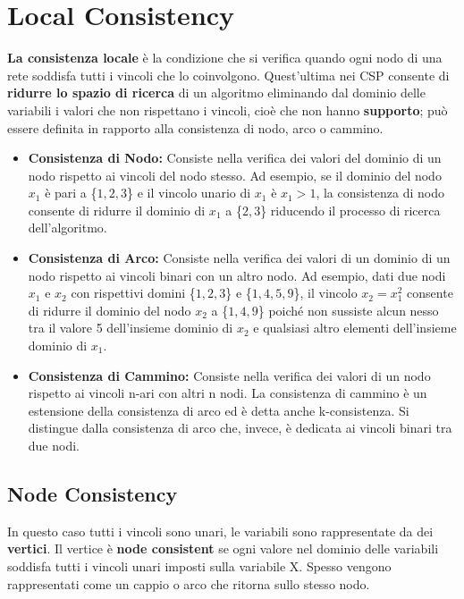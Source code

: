 \section{Local Consistency}
\textbf{La consistenza locale} è la condizione che si verifica quando ogni nodo
di una rete soddisfa tutti i vincoli che lo coinvolgono. Quest'ultima nei CSP
consente di \textbf{ridurre lo spazio di ricerca} di un algoritmo eliminando dal
dominio delle variabili i valori che non rispettano i vincoli, cioè che non
hanno \textbf{supporto}; può essere definita in rapporto alla consistenza di
nodo, arco o cammino.
\begin{itemize}
    \item \textbf{Consistenza di Nodo:} Consiste nella verifica dei valori del
          dominio di un nodo rispetto ai vincoli del nodo stesso. Ad esempio, se il
          dominio del nodo $x_1$ è pari a \{$1,2,3$\} e il vincolo unario di $x_1$ è $x_1 >
              1$, la consistenza di nodo consente di ridurre il dominio di $x_1$ a \{$2,3$\}
          riducendo il processo di ricerca dell'algoritmo.
    \item \textbf{Consistenza di Arco:} Consiste nella verifica dei valori di un
          dominio di un nodo rispetto ai vincoli binari con un altro nodo. Ad esempio,
          dati due nodi $x_1$ e $x_2$ con rispettivi domini \{$1,2,3$\} e \{$1,4,5,9$\}, il
          vincolo $x_2 = x_{1}^2$ consente di ridurre il dominio del nodo $x_2$ a \{$1,4,9$\}
          poiché non sussiste alcun nesso tra il valore 5 dell'insieme dominio di
          $x_2$ e qualsiasi altro elementi dell'insieme dominio di $x_1$.
    \item \textbf{Consistenza di Cammino:} Consiste nella verifica dei valori di
          un nodo rispetto ai vincoli n-ari con altri n nodi. La consistenza di
          cammino è un estensione della consistenza di arco ed è detta anche
          k-consistenza. Si distingue dalla consistenza di arco che, invece, è
          dedicata ai vincoli binari tra due nodi.
\end{itemize}

\subsection{Node Consistency}
In questo caso tutti i vincoli sono unari, le variabili sono rappresentate da
dei \textbf{vertici}. Il vertice è \textbf{node consistent} se ogni valore nel
dominio delle variabili soddisfa tutti i vincoli unari imposti sulla variabile
X. Spesso vengono rappresentati come un cappio o arco che ritorna sullo stesso
nodo.

